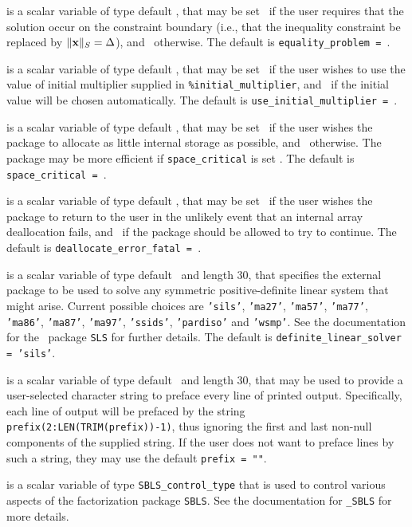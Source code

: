 \documentclass{galahad}
\begin{document}
\begin{description}
 is a scalar variable of type default \logical, that
may be set \true\ if the user requires that the solution
occur on the constraint boundary (i.e., that the inequality constraint be
replaced by $\|{\mathbf{x}}\|_S = \Delta$), and \false\ otherwise.
The default is {\tt equality\_problem = \false}.

 is a scalar variable of type default \logical,
that may be set \true\ if the user wishes to use the value of initial
multiplier supplied in {\tt \%initial\_multiplier},
and \false\ if the initial value will be chosen automatically.
The default is {\tt use\_initial\_multiplier = \false}.

 is a scalar variable of type default \logical, that
may be set \true\ if the user wishes the package to allocate as little
internal storage as possible, and \false\ otherwise. The package may
be more efficient if {\tt space\_critical} is set \false.
The default is {\tt space\_critical = \false}.

 is a scalar variable of type default \logical,
that may be set \true\ if the user wishes the package to return to the user
in the unlikely event that an internal array deallocation fails,
and \false\ if the package should be allowed to try to continue.
The default is {\tt deallocate\_error\_fatal = \false}.

 is a scalar variable of type default \character\
and length 30, that specifies the external package to be used to
solve any symmetric positive-definite linear system that might arise.
Current possible
choices are {\tt 'sils'}, {\tt 'ma27'}, {\tt 'ma57'}, {\tt 'ma77'},
{\tt 'ma86'}, {\tt 'ma87'}, {\tt 'ma97'}, {\tt 'ssids'}, {\tt 'pardiso'}
and {\tt 'wsmp'}.
See the documentation for the \galahad\ package {\tt SLS} for further details.
The default is {\tt definite\_linear\_solver = 'sils'}.

 is a scalar variable of type default \character\
and length 30, that may be used to provide a user-selected
character string to preface every line of printed output.
Specifically, each line of output will be prefaced by the string
{\tt prefix(2:LEN(TRIM(prefix))-1)},
thus ignoring the first and last non-null components of the
supplied string. If the user does not want to preface lines by such
a string, they may use the default {\tt prefix = ""}.

 is a scalar variable of type
{\tt SBLS\_control\_type} that is used to control various aspects of the
factorization package {\tt SBLS}. See the documentation for
{\tt \libraryname\_SBLS} for more details.


\end{description}
\end{document}
